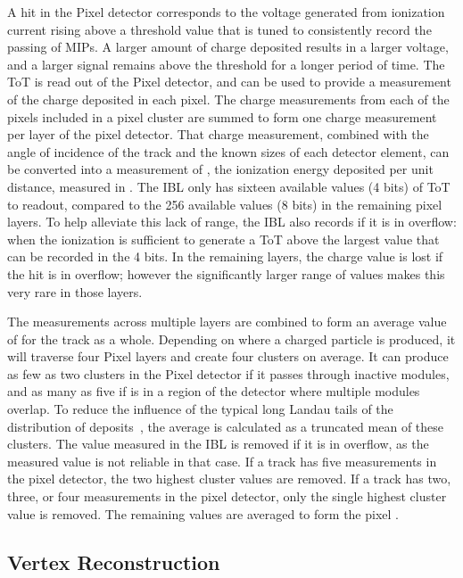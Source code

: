 A hit in the Pixel detector corresponds to the voltage generated from ionization current rising above a threshold value that is tuned to consistently record the passing of \acp{MIP}. 
A larger amount of charge deposited results in a larger voltage, and a larger signal remains above the threshold for a longer period of time.
The \ac{ToT} is read out of the Pixel detector, and can be used to provide a measurement of the charge deposited in each pixel.
The charge measurements from each of the pixels included in a pixel cluster are summed to form one charge measurement per layer of the pixel detector.
That charge measurement, combined with the angle of incidence of the track and the known sizes of each detector element, can be converted into a measurement of \dedx, the ionization energy deposited per unit distance, measured in \MeVgcm. 
The \ac{IBL} only has sixteen available values (4 bits) of \ac{ToT} to readout, compared to the 256 available values (8 bits) in the remaining pixel layers.
To help alleviate this lack of range, the \ac{IBL} also records if it is in overflow: when the ionization is sufficient to generate a \ac{ToT} above the largest value that can be recorded in the 4 bits.
In the remaining layers, the charge value is lost if the hit is in overflow; however the significantly larger range of values makes this very rare in those layers.

The measurements across multiple layers are combined to form an average value of \dedx for the track as a whole.
Depending on where a charged particle is produced, it will traverse four Pixel layers and create four clusters on average.
It can produce as few as two clusters in the Pixel detector if it passes through inactive modules, and as many as five if is in a region of the detector where multiple modules overlap.
To reduce the influence of the typical long Landau tails of the distribution of \dedx deposits~\cite{pdg}, the average is calculated as a truncated mean of these clusters.
The value measured in the \ac{IBL} is removed if it is in overflow, as the measured value is not reliable in that case.
If a track has five measurements in the pixel detector, the two highest cluster values are removed.
If a track has two, three, or four measurements in the pixel detector, only the single highest cluster value is removed.
The remaining values are averaged to form the pixel \dedx.

\subsection{Vertex Reconstruction}
\label{sec:vertices}

